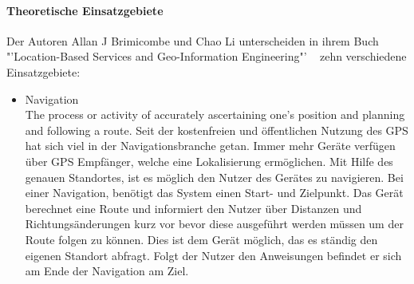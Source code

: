 \paragraph{Theoretische Einsatzgebiete}
Der Autoren Allan J Brimicombe und Chao Li unterscheiden in ihrem Buch "'Location-Based Services and Geo-Information Engineering"' ~\cite[S.132]{brimicombe_li:application_area} zehn verschiedene Einsatzgebiete:
\begin{itemize}
	\item Navigation\\
The process or activity of accurately ascertaining one’s position and planning and following a route.
Seit der kostenfreien und öffentlichen Nutzung des GPS hat sich viel in der Navigationsbranche getan. Immer mehr Geräte verfügen über GPS Empfänger, welche eine Lokalisierung ermöglichen. Mit Hilfe des genauen Standortes, ist es möglich den Nutzer des Gerätes zu navigieren. Bei einer Navigation, benötigt das System einen Start- und Zielpunkt. Das Gerät berechnet eine Route und informiert den Nutzer über Distanzen und Richtungsänderungen kurz vor bevor diese ausgeführt werden müssen um der Route folgen zu können. Dies ist dem Gerät möglich, das es ständig den eigenen Standort abfragt. Folgt der Nutzer den Anweisungen befindet er sich am Ende der Navigation am Ziel.


\end{itemize}
